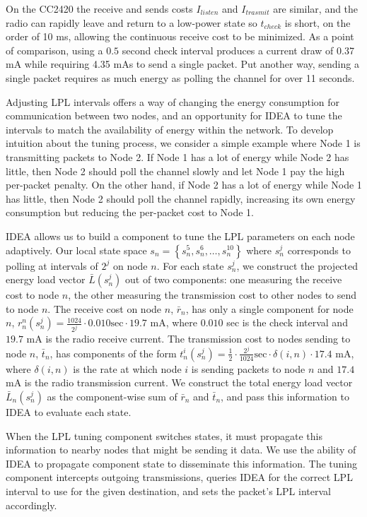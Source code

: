 On the CC2420 the receive and sends costs $I_{listen}$ and $I_{trasmit}$ are
similar, and the radio can rapidly leave and return to a low-power state so
$t_{check}$ is short, on the order of 10 ms, allowing the continuous receive
cost to be minimized. As a point of comparison, using a $0.5$ second check
interval produces a current draw of 0.37 mA while requiring 4.35 mAs to send
a single packet. Put another way, sending a single packet requires as much
energy as polling the channel for over 11 seconds.

Adjusting LPL intervals offers a way of changing the energy consumption for
communication between two nodes, and an opportunity for IDEA to tune the
intervals to match the availability of energy within the network. To develop
intuition about the tuning process, we consider a simple example where Node 1
is transmitting packets to Node 2. If Node 1 has a lot of energy while Node 2
has little, then Node 2 should poll the channel slowly and let Node 1 pay the
high per-packet penalty. On the other hand, if Node 2 has a lot of energy
while Node 1 has little, then Node 2 should poll the channel rapidly,
increasing its own energy consumption but reducing the per-packet cost to
Node 1.

IDEA allows us to build a component to tune the LPL parameters on each node
adaptively. Our local state space $s_n = \left\{s_n^5, s_n^6, \ldots,
s_n^{10} \right\}$ where $s_n^j$ corresponds to polling at intervals of $2^j$
on node $n$. For each state $s^j_n$, we construct the projected energy load
vector $\bar{L}(s^j_n)$ out of two components: one measuring the receive cost
to node $n$, the other measuring the transmission cost to other nodes to send
to node $n$. The receive cost on node $n$, $\bar{r}_n$, has only a single
component for node $n$, $r_n^n(s_n^j) = \frac{1024}{2^j} \cdot 0.010
\textrm{sec} \cdot 19.7$ mA, where $0.010$ sec is the check interval and $19.7$ mA is the
radio receive current. The transmission cost to nodes sending to node $n$,
$\bar{t}_n$, has components of the form $t^i_n(s_n^j) = \frac{1}{2} \cdot
\frac{2^j}{1024} \textrm{sec} \cdot \delta(i,n) \cdot 17.4$ mA, where $\delta(i,n)$
is the rate at which node $i$ is sending packets to node $n$ and $17.4$ mA is
the radio transmission current. We construct the total energy load vector
$\bar{L}_n(s^j_n)$ as the component-wise sum of $\bar{r}_n$ and $\bar{t}_n$,
and pass this information to IDEA to evaluate each state.

When the LPL tuning component switches states, it must propagate this
information to nearby nodes that might be sending it data. We use the ability
of IDEA to propagate component state to disseminate this information. The
tuning component intercepts outgoing transmissions, queries IDEA for the
correct LPL interval to use for the given destination, and sets the packet's
LPL interval accordingly.

